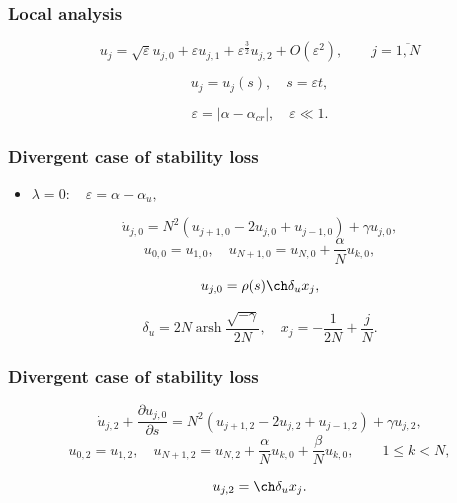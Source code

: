 \documentclass[fullscreen=true, unicode, bookmarks=false]{beamer}
\DeclareMathOperator{\arsh}{arsh}
\begin{document}
\begin{frame}
\frametitle{ Local analysis }

\begin{equation}
	u_j = \sqrt{\varepsilon}u_{j,0} + \varepsilon u_{j,1} + \varepsilon^{\frac{3}{2}} u_{j,2} + O(\varepsilon^2), \qquad j = \overline{1, N}
\end{equation}

\bigskip

$$ u_j = u_j(s), \quad s = \varepsilon t, $$

$$ \varepsilon = | \alpha - \alpha_{cr} |, \quad \varepsilon \ll 1.  $$

\end{frame}

\begin{frame}
\frametitle{ Divergent case of stability loss }

\begin{itemize}
\item { $ \lambda = 0: \quad \varepsilon=\alpha-\alpha_u, $
}
\end{itemize}

\bigskip

\begin{equation}
	\dot u_{j,0} = N^2(u_{j+1,0} - 2u_{j,0} + u_{j-1,0}) + \gamma u_{j,0},
\end{equation}
\begin{equation}
	u_{0,0} = u_{1,0}, \quad u_{N+1,0} = u_{N,0} + \dfrac{\alpha}{N}u_{k,0},
\end{equation}

\bigskip

$$ u_{j,0} = \rho(s) \ch \delta_u x_j, $$

$$ \delta_u = 2N \arsh \dfrac{\sqrt{-\gamma}}{2N}, \quad x_j = -\dfrac{1}{2N} + \dfrac{j}{N}. $$

\end{frame}

\begin{frame}
\frametitle{ Divergent case of stability loss }

\begin{equation}
	\dot u_{j,2} + \frac{\partial u_{j,0}}{\partial s} = N^2(u_{j+1,2} - 2u_{j,2} + u_{j-1,2}) + \gamma u_{j,2},
\end{equation}
\begin{equation}
	u_{0,2} = u_{1,2}, \quad u_{N+1,2} = u_{N,2} + \dfrac{\alpha}{N}u_{k,0} + \dfrac{\beta}{N}u_{k,0}, \qquad 1 \le k < N,
\end{equation}

\bigskip

$$ u_{j,2} = \ch \delta_u x_j. $$


\end{frame}
\end{document}
